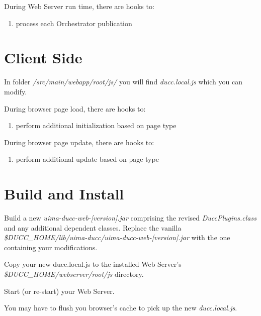     During Web Server run time, there are hooks to:
    
	\begin{enumerate}
      \item process each Orchestrator publication
    \end{enumerate}
    
\section{Client Side}

	In folder {\em /src/main/webapp/root/js/} you will find 
	{\em ducc.local.js} which you can modify.
	
	During browser page load, there are hooks to:
	
	\begin{enumerate}
      \item perform additional initialization based on page type
    \end{enumerate}

	During browser page update, there are hooks to:
	
	\begin{enumerate}
      \item perform additional update based on page type
    \end{enumerate}
    
\section{Build and Install}   

	Build a new {\em uima-ducc-web-[version].jar} comprising the revised
	{\em DuccPlugins.class} and any additional dependent classes.
	Replace the vanilla {\em \$DUCC\_HOME/lib/uima-ducc/uima-ducc-web-[version].jar} 
	with the one containing your modifications.

	Copy your new ducc.local.js to the installed Web Server's 
	{\em \$DUCC\_HOME/webserver/root/js} directory.
	
	Start (or re-start) your Web Server.
	
	You may have to flush you browser's cache to pick up the new {\em ducc.local.js}.
	
	
	
	
	
